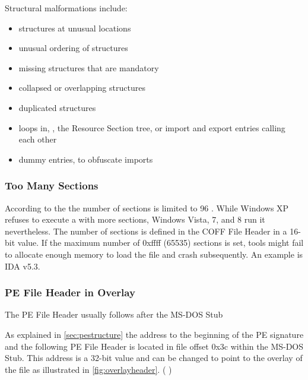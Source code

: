 Structural malformations include:

\begin{itemize}
\item structures at unusual locations
\item unusual ordering of structures
\item missing structures that are mandatory
\item collapsed or overlapping structures
\item duplicated structures
\item loops in, \eg{}, the Resource Section tree, or import and export entries calling each other 
\item dummy entries, \eg{} to obfuscate imports
\end{itemize}


\subsubsection*{Too Many Sections}

According to the \PECOFF{} the number of sections is limited to 96 \cite[]{pespec}. While Windows XP refuses to execute a \PE{} with more sections, Windows Vista, 7, and 8 run it nevertheless. The number of sections is defined in the COFF File Header in a 16-bit value. If the maximum number of 0xffff (65535) sections is set, tools might fail to allocate enough memory to load the file and crash subsequently. An example is IDA v5.3.

\subsubsection*{PE File Header in Overlay}

The PE File Header usually follows after the MS-DOS Stub 

As explained in \autoref{sec:pestructure} the address to the beginning of the PE signature and the following PE File Header is located in file offset 0x3c within the MS-DOS Stub. This address is a 32-bit value and can be changed to point to the overlay of the file as illustrated in \autoref{fig:overlayheader}. (\cf{} \cite[slide 13]{vuksan11})

